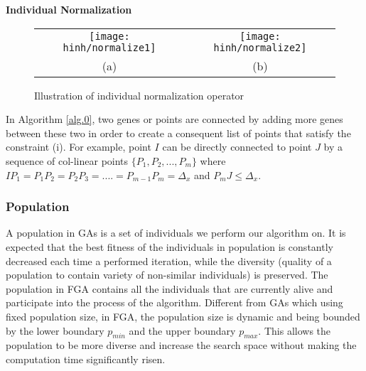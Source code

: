 \documentclass[final]{elsarticle}
\begin{document}
\begin{algorithm}[H]
	\SetAlgoLined
		\caption{\textbf{Individual Normalization}} 
		\label{alg.0}
\end{algorithm} 
\begin{figure*}[h]
	\begin{tabular}{cc}
		\texttt{[image: hinh/normalize1]}&\texttt{[image: hinh/normalize2]}\\
		(a) &(b)\\
	\end{tabular}
	\centering
	\caption{Illustration of individual normalization operator
	}
	\label{Fig.6}       %
\end{figure*}

In Algorithm \ref*{alg.0}, two genes or points are connected by adding more genes between these two in order to create a consequent list of points that satisfy the constraint (i). For example, point $ I $ can be directly connected to point $ J $ by a sequence of col-linear points $\{P_1,P_2,...,P_m\}$ where $IP_1=P_1P_2=P_2P_3=....=P_{m-1}P_m=\Delta_x$ and $P_mJ \leq \Delta_x$.\\

\subsubsection{Population}

A population in GAs is a set of individuals we perform our algorithm on. It is expected that the best fitness of the individuals in population is constantly decreased each time a performed iteration, while the diversity (quality of a population to contain variety of non-similar individuals) is preserved. The population in FGA contains all the individuals that are currently alive and participate into the process of the algorithm. Different from GAs which using fixed population size, in FGA, the population size is dynamic and being bounded by the lower boundary $p_{min}$ and the upper boundary $p_{max}$. This allows the population to be more diverse and increase the search space without making the computation time significantly risen.
\end{document}
